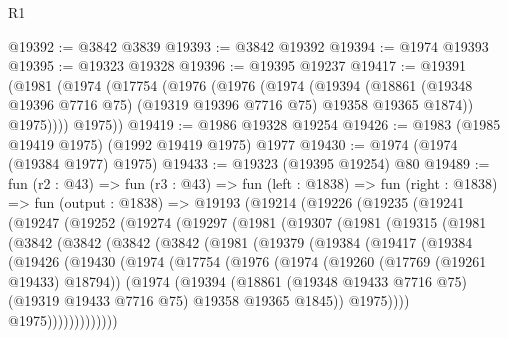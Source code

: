 \begin{lexlean}{R1}
\begin{coremodule}
@19392 := @3842 @3839
@19393 := @3842 @19392
@19394 := @1974 @19393
@19395 := @19323 @19328
@19396 := @19395 @19237
@19417 := @19391
    (@1981
      (@1974
        (@17754
          (@1976
            (@1976
              (@1974
                (@19394
                  (@18861 (@19348 @19396 @7716 @75) (@19319 @19396 @7716 @75) @19358 @19365 @1874))
                @1975))))
        @1975))
@19419 := @1986 @19328 @19254
@19426 := @1983 (@1985 @19419 @1975) (@1992 @19419 @1975) @1977
@19430 := @1974 (@1974 (@19384 @1977) @1975)
@19433 := @19323 (@19395 @19254) @80
@19489 := fun (r2 : @43) =>
  fun (r3 : @43) =>
  fun (left : @1838) =>
  fun (right : @1838) =>
  fun (output : @1838) =>
  @19193
    (@19214
      (@19226
        (@19235
          (@19241
            (@19247
              (@19252
                (@19274
                  (@19297
                    (@1981
                      (@19307
                        (@1981
                          (@19315
                            (@1981
                              (@3842
                                (@3842
                                  (@3842
                                    (@3842
                                      (@1981
                                        (@19379
                                          (@19384
                                            (@19417
                                              (@19384
                                                (@19426
                                                  (@19430
                                                    (@1974
                                                      (@17754
                                                        (@1976
                                                          (@1974
                                                            (@19260 (@17769 (@19261 @19433) @18794))
                                                            (@1974
                                                              (@19394
                                                                (@18861
                                                                  (@19348 @19433 @7716 @75)
                                                                  (@19319 @19433 @7716 @75)
                                                                  @19358
                                                                  @19365
                                                                  @1845))
                                                              @1975))))
                                                      @1975)))))))))))))

\end{coremodule}
\end{lexlean}
